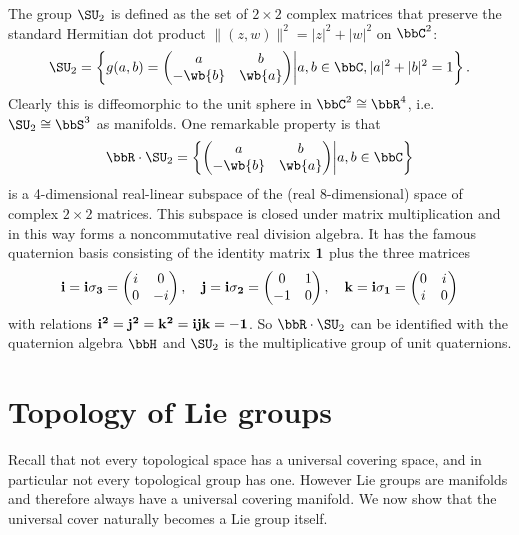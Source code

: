 \begin{example}
    The group $\SU_2$ is defined as the set of $2\times2$ complex matrices that preserve the standard Hermitian dot product $\lVert(z,w)\rVert^2=|z|^2+|w|^2$ on $\bbC^2$:
    \[\SU_2=\left\{g(a,b)=
    \begin{pmatrix}
        a&b\\-\wb{b}&\wb{a}
    \end{pmatrix}
    \middle| a,b\in\bbC, |a|^2+|b|^2=1
    \right\}.\]
    Clearly this is diffeomorphic to the unit sphere in $\bbC^2\cong \bbR^4$, i.e.~$\SU_2\cong \bbS^3$ as manifolds. One remarkable property is that 
    \[\bbR\cdot \SU_2=\left\{
    \begin{pmatrix}
        a&b\\-\wb{b}&\wb{a}
    \end{pmatrix}
    \middle| a,b\in\bbC
    \right\}\]
    is a 4-dimensional real-linear subspace of the (real 8-dimensional) space of complex $2\times 2$ matrices. This subspace is closed under matrix multiplication and in this way forms a noncommutative real division algebra. It has the famous quaternion basis consisting of the identity matrix $\bf{1}$ plus the three matrices
    \[\bf{i}=i\sigma_3=\begin{pmatrix}
        i&0\\0&-i
    \end{pmatrix},\quad 
    \bf{j}=i\sigma_2=\begin{pmatrix}
        0&1\\-1&0
    \end{pmatrix},\quad
    \bf{k}=i\sigma_1=\begin{pmatrix}
        0&i\\i&0
    \end{pmatrix}\]
    with relations $\bf{i}^2=\bf{j}^2=\bf{k}^2=\bf{ijk}=-\bf{1}$. So $\bbR\cdot\SU_2$ can be identified with the quaternion algebra $\bbH$ and $\SU_2$ is the multiplicative group of unit quaternions.
\end{example}










\section{Topology of Lie groups}

Recall that not every topological space has a universal covering space, and in particular not every topological group has one. However Lie groups are manifolds and therefore always have a universal covering manifold. We now show that the universal cover naturally becomes a Lie group itself.

